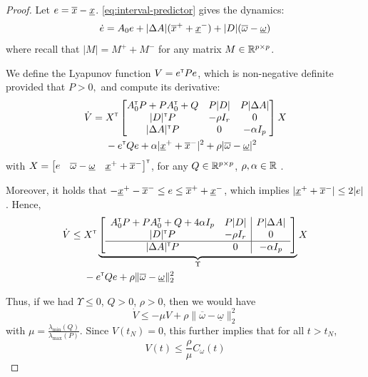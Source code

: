 \documentclass{article}
\begin{document}
\begin{proof}
Let $e = \overline{x} - \underline{x}$. \eqref{eq:interval-predictor} gives the dynamics:
\begin{align*}
\dot{e} = A_0e + |\Delta A|(\overline{x}^+ + \underline{x}^-) + |D|(\overline{\omega} - \underline{\omega})
\end{align*}
where recall that $|M| = M^+ + M^-$ for any matrix $M\in\mathbb{R}^{p\times p}$.

We define the Lyapunov function $V = e^{\mathsf{\scriptscriptstyle T}} P e$, which is non-negative definite provided that
$
P>0,
$ and compute its derivative:
\begin{align*}
\dot{V} ={}& X^{\mathsf{\scriptscriptstyle T}}
\begin{bmatrix}
A_0^{\mathsf{\scriptscriptstyle T}} P + P A_0^{\mathsf{\scriptscriptstyle T}} + Q & P|D| & P|\Delta A| \\
|D|^{\mathsf{\scriptscriptstyle T}} P & -\rho I_r & 0\\
|\Delta A|^{\mathsf{\scriptscriptstyle T}} P & 0 & -\alpha I_p
\end{bmatrix}
X\\
& - e^{\mathsf{\scriptscriptstyle T}} Q e + \alpha |\underline{x}^+ + \overline{x}^-|^2 + \rho |\overline{\omega} - \underline{\omega}|^2
\end{align*}
with $X=\begin{bmatrix}
e & \overline{\omega} - \underline{\omega} &  \underline{x}^+ + \overline{x}^-
\end{bmatrix}^{\mathsf{\scriptscriptstyle T}}$, for any $Q\in\mathbb{R}^{p\times p}$, $\rho,\alpha\in\mathbb{R}$ . 

Moreover, it holds that $-\underline{x}^+ -\overline{x}^- \leq e \leq \overline{x}^+ + \underline{x}^-$, which implies $|\underline{x}^+ + \overline{x}^-| \leq 2 |e|$. Hence,
\begin{align*}
\dot{V} \leq {}& X^{\mathsf{\scriptscriptstyle T}}
\underbrace{
\left[
\begin{array}{cc|c}
A_0^{\mathsf{\scriptscriptstyle T}} P + P A_0^{\mathsf{\scriptscriptstyle T}} + Q + 4\alpha I_p & P|D| & P|\Delta A| \\
|D|^{\mathsf{\scriptscriptstyle T}} P & -\rho I_r & 0\\
\hline
|\Delta A|^{\mathsf{\scriptscriptstyle T}} P & 0 & -\alpha I_p
\end{array}
\right]}_{\Upsilon}
X\\
& - e^{\mathsf{\scriptscriptstyle T}} Q e + \rho \|\overline{\omega} - \underline{\omega}\|_2^2
\end{align*}

Thus, if we had $\Upsilon \leq 0$, $Q>0$, $\rho > 0$, then we would have
\[
\dot{V} \leq -\mu V + \rho \|\overline{\omega} - \underline{\omega}\|_2^2
\]
with $\mu = \frac{\lambda_{\min}(Q)}{\lambda_{\max}(P)}$. Since $V(t_N) = 0$, this further implies that for all $t>t_N$, 
\begin{equation}
\label{eq:lyap-bound}
V(t) \leq \frac{\rho}{\mu} C_\omega(t)
\end{equation}


\end{proof}
\end{document}
